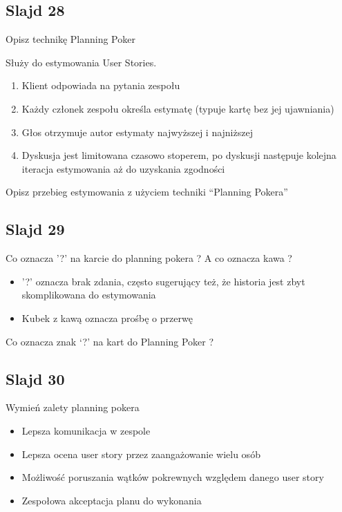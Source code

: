 \documentclass[a4paper,15pt]{article}
\newcommand{\question}[2]{
    \begin{tcolorbox}[colback=mRed!5!white,colframe=mRed,title={Kolokwium 2018 #1}]
        #2
    \end{tcolorbox}
}
\begin{document}
\subsection{Slajd 28}
\begin{framed}
Opisz technikę Planning Poker
\end{framed}
Służy do estymowania User Stories.
\begin{enumerate}
\item Klient odpowiada na pytania zespołu
\item Każdy członek zespołu określa estymatę (typuje kartę bez jej ujawniania)
\item Głos otrzymuje autor estymaty najwyższej i najniższej
\item Dyskusja jest limitowana czasowo stoperem, po dyskusji następuje kolejna iteracja estymowania aż do uzyskania zgodności
\end{enumerate} 
 
\question{}{
Opisz przebieg estymowania z użyciem techniki “Planning Pokera” 
} 
 
\subsection{Slajd 29}
\begin{framed}
Co oznacza '?' na karcie do planning pokera ? A co oznacza kawa ?
\end{framed}
\begin{itemize}
\item '?' oznacza brak zdania, często sugerujący też, że historia jest zbyt skomplikowana do estymowania
\item Kubek z kawą oznacza prośbę o przerwę
\end{itemize}

\question{}{
Co oznacza znak ‘?’ na kart do Planning Poker ?
}


\subsection{Slajd 30}
\begin{framed}
Wymień zalety planning pokera
\end{framed}
\begin{itemize}
\item Lepsza komunikacja w zespole
\item Lepsza ocena user story przez zaangażowanie wielu osób
\item Możliwość poruszania wątków pokrewnych względem danego user story
\item Zespołowa akceptacja planu do wykonania
\end{itemize}
\end{document}
